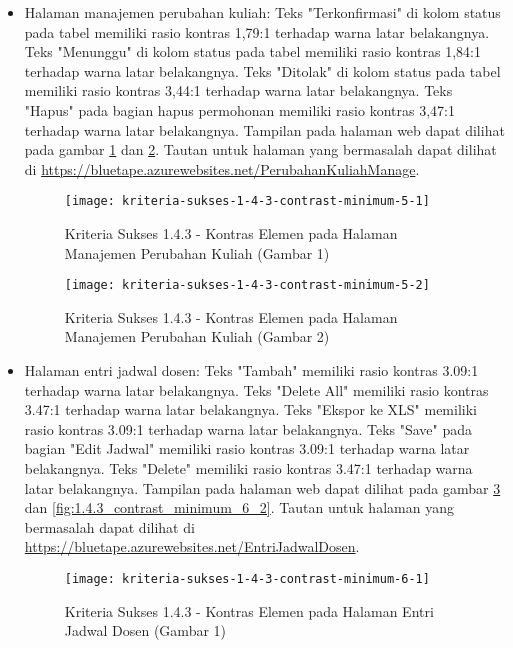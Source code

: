 \begin{itemize}
    \item Halaman manajemen perubahan kuliah: Teks "Terkonfirmasi" di kolom status pada tabel memiliki rasio kontras 1,79:1 terhadap warna latar belakangnya. Teks "Menunggu" di kolom status pada tabel memiliki rasio kontras 1,84:1 terhadap warna latar belakangnya. Teks "Ditolak" di kolom status pada tabel memiliki rasio kontras 3,44:1 terhadap warna latar belakangnya. Teks "Hapus" pada bagian hapus permohonan memiliki rasio kontras 3,47:1 terhadap warna latar belakangnya. Tampilan pada halaman web dapat dilihat pada gambar \ref{fig:1.4.3_contrast_minimum_5_1} dan \ref{fig:1.4.3_contrast_minimum_5_2}. Tautan untuk halaman yang bermasalah dapat dilihat di \url{https://bluetape.azurewebsites.net/PerubahanKuliahManage}.
    \begin{figure}[H]
        \centering  
        \texttt{[image: kriteria-sukses-1-4-3-contrast-minimum-5-1]}  
        \caption[Kriteria Sukses 1.4.3 - Kontras Elemen pada Halaman Manajemen Perubahan Kuliah (Gambar 1)]{Kriteria Sukses 1.4.3 - Kontras Elemen pada Halaman Manajemen Perubahan Kuliah (Gambar 1)}
        \label{fig:1.4.3_contrast_minimum_5_1}
    \end{figure} 
    
    \begin{figure}[H]
        \centering  
        \texttt{[image: kriteria-sukses-1-4-3-contrast-minimum-5-2]}  
        \caption[Kriteria Sukses 1.4.3 - Kontras Elemen pada Halaman Manajemen Perubahan Kuliah (Gambar 2)]{Kriteria Sukses 1.4.3 - Kontras Elemen pada Halaman Manajemen Perubahan Kuliah (Gambar 2)}
        \label{fig:1.4.3_contrast_minimum_5_2}
    \end{figure} 

    \item Halaman entri jadwal dosen: Teks "Tambah" memiliki rasio kontras 3.09:1 terhadap warna latar belakangnya. Teks "Delete All" memiliki rasio kontras 3.47:1 terhadap warna latar belakangnya. Teks "Ekspor ke XLS" memiliki rasio kontras 3.09:1 terhadap warna latar belakangnya. Teks "Save" pada bagian "Edit Jadwal" memiliki rasio kontras 3.09:1 terhadap warna latar belakangnya. Teks "Delete" memiliki rasio kontras 3.47:1 terhadap warna latar belakangnya. Tampilan pada halaman web dapat dilihat pada gambar \ref{fig:1.4.3_contrast_minimum_6_1} dan \ref{fig:1.4.3_contrast_minimum_6_2}. Tautan untuk halaman yang bermasalah dapat dilihat di \url{https://bluetape.azurewebsites.net/EntriJadwalDosen}.	
    \begin{figure}[H]
        \centering  
        \texttt{[image: kriteria-sukses-1-4-3-contrast-minimum-6-1]}  
        \caption[Kriteria Sukses 1.4.3 - Kontras Elemen pada Halaman Entri Jadwal Dosen (Gambar 1)]{Kriteria Sukses 1.4.3 - Kontras Elemen pada Halaman Entri Jadwal Dosen (Gambar 1)}
        \label{fig:1.4.3_contrast_minimum_6_1}  
    \end{figure} 
    

\end{itemize}
